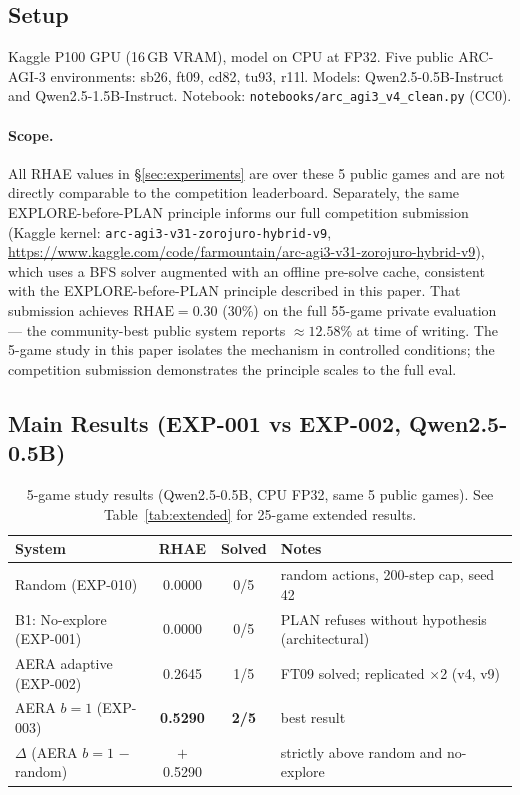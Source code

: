 \documentclass[11pt]{article}
\begin{document}
\subsection{Setup}

Kaggle P100 GPU (16\,GB VRAM), model on CPU at FP32. Five public ARC-AGI-3 environments: sb26, ft09, cd82, tu93, r11l. Models: Qwen2.5-0.5B-Instruct and Qwen2.5-1.5B-Instruct. Notebook: \texttt{notebooks/arc\_agi3\_v4\_clean.py} (CC0).

\paragraph{Scope.} All RHAE values in \S\ref{sec:experiments} are over these 5 public games and are not directly comparable to the competition leaderboard. Separately, the same EXPLORE-before-PLAN principle informs our full competition submission (Kaggle kernel: \texttt{arc-agi3-v31-zorojuro-hybrid-v9}, \url{https://www.kaggle.com/code/farmountain/arc-agi3-v31-zorojuro-hybrid-v9}), which uses a BFS solver augmented with an offline pre-solve cache, consistent with the EXPLORE-before-PLAN principle described in this paper. That submission achieves $\text{RHAE} = 0.30$ (30\%) on the full 55-game private evaluation --- the community-best public system reports $\approx 12.58\%$ at time of writing. The 5-game study in this paper isolates the mechanism in controlled conditions; the competition submission demonstrates the principle scales to the full eval.

\subsection{Main Results (EXP-001 vs EXP-002, Qwen2.5-0.5B)}

\begin{table}[h]
\centering
\caption{5-game study results (Qwen2.5-0.5B, CPU FP32, same 5 public games). See Table~\ref{tab:extended} for 25-game extended results.}
\label{tab:main}
\begin{tabular}{lccl}
\toprule
System & RHAE & Solved & Notes \\
\midrule
Random (EXP-010)             & 0.0000 & 0/5 & random actions, 200-step cap, seed 42 \\
B1: No-explore (EXP-001)     & 0.0000 & 0/5 & PLAN refuses without hypothesis (architectural) \\
AERA adaptive (EXP-002)      & 0.2645 & 1/5 & FT09 solved; replicated ×2 (v4, v9) \\
AERA $b{=}1$ (EXP-003)       & \textbf{0.5290} & \textbf{2/5} & best result \\
\midrule
$\Delta$ (AERA $b{=}1$ $-$ random) & $+$0.5290 & & strictly above random and no-explore \\
\bottomrule
\end{tabular}
\end{table}
\end{document}
